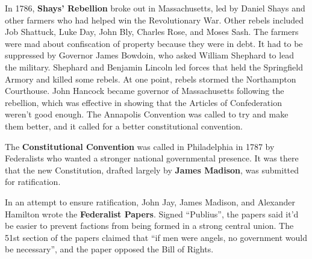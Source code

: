 In 1786, \textbf{Shays' Rebellion} broke out in Massachusetts,
led by Daniel Shays and other farmers who had helped win the Revolutionary War.
Other rebels included Job Shattuck, Luke Day, John Bly, Charles Rose, and Moses Sash.
The farmers were mad about confiscation of property because they were in debt.
It had to be suppressed by Governor James Bowdoin, who asked William Shephard to lead the military.
Shephard and Benjamin Lincoln led forces that held the Springfield Armory and killed some rebels.
At one point, rebels stormed the Northampton Courthouse.
John Hancock became governor of Massachusetts following the rebellion,
which was effective in showing that the Articles of Confederation weren't good enough.
The Annapolis Convention was called to try and make them better,
and it called for a better constitutional convention.

The \textbf{Constitutional Convention} was called in Philadelphia in 1787
by Federalists who wanted a stronger national governmental presence.
It was there that the new Constitution, drafted largely by \textbf{James Madison},
was submitted for ratification.

In an attempt to ensure ratification,
John Jay, James Madison, and Alexander Hamilton wrote the \textbf{Federalist Papers}.
Signed ``Publius'',
the papers said it'd be easier to prevent factions from being formed in a strong central union.
The 51st section of the papers claimed that
``if men were angels, no government would be necessary'',
and the paper opposed the Bill of Rights.
